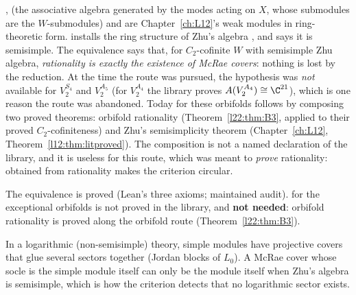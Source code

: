 \begin{dictionary}
,  (the associative algebra generated by the modes acting on $X$, whose
submodules are the $W$-submodules) and  are Chapter~\ref{ch:L12}'s weak modules in ring-theoretic
form.  installs the ring structure of Zhu's algebra , and
 says it is semisimple. The equivalence says that, for $C_2$-cofinite $W$ with
semisimple Zhu algebra, \emph{rationality is exactly the existence of McRae covers}: nothing is lost by the reduction.
At the time the route was pursued, the hypothesis  was \emph{not} available for $V_2^{S_4}$ and $V_2^{A_5}$ (for
$V_2^{A_4}$ the library proves $A(V_2^{A_4})\cong\C^{21}$), which is one reason the route was abandoned. Today 
for these orbifolds follows by composing two proved theorems: orbifold rationality 
(Theorem~\ref{l22:thm:B3}, applied to their proved $C_2$-cofiniteness) and Zhu's semisimplicity theorem
 (Chapter~\ref{ch:L12}, Theorem~\ref{l12:thm:litproved}). The composition is not a named
declaration of the library, and it is useless for this route, which was meant to \emph{prove} rationality:  obtained
from rationality makes the criterion circular.
\end{dictionary}

\begin{status}
The equivalence is proved (Lean's three axioms; maintained audit).  for the exceptional orbifolds is
not proved in the library, and \textbf{not needed}: orbifold rationality is proved along the orbifold route (Theorem~\ref{l22:thm:B3}).
\end{status}

\begin{physics}
In a logarithmic (non-semisimple) theory, simple modules have projective covers that glue several sectors together
(Jordan blocks of $L_0$). A McRae cover whose socle is the simple module itself can only be the module itself when Zhu's
algebra is semisimple, which is how the criterion detects that no logarithmic sector exists.
\end{physics}

